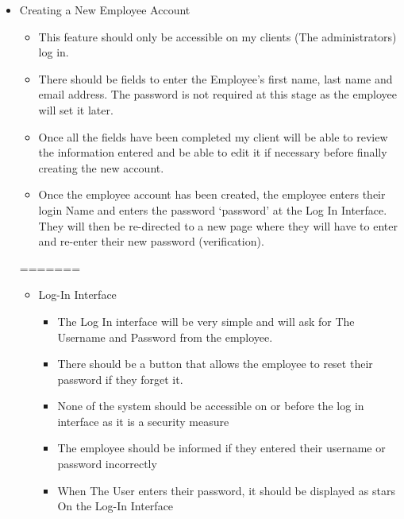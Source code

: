 \begin{itemize}
	\item Creating a New Employee Account
	\begin{itemize}
		\item This feature should only be accessible on my clients (The administrators) log in.
		\item There should be fields to enter the Employee's first name, last name and email address. The password is not required at this stage as the employee will set it later.
		\item Once all the fields have been completed my client will be able to review the information entered and be able to edit it if necessary before finally creating the new account.
		\item Once the employee account has been created, the employee enters their login Name and enters the password ‘password’ at the Log In Interface. They will then be re-directed to a new page where they will have to enter and re-enter their new password (verification). 
	\end{itemize}
=======
\begin{itemize}
	\item Log-In Interface
	\begin{itemize}
		\item The Log In interface will be very simple and will ask for The Username and Password from the employee.
		\item There should be a button that allows the employee to reset their password if they forget it.
		\item None of the system should be accessible on or before the log in interface as it is a security measure
		\item The employee should be informed if they entered their username or password incorrectly
		\item When The User enters their password, it should be displayed as stars On the Log-In Interface
	\end{itemize}

\pagebreak


\end{itemize}
\end{itemize}
